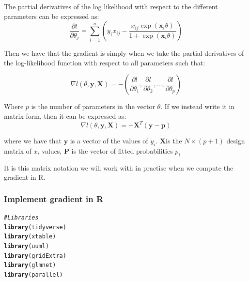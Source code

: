 \documentclass[11pt, a4paper, english]{article}\usepackage[]{graphicx}\usepackage[dvipsnames]{xcolor}
\makeatletter
\newcommand{\hlcom}[1]{\textcolor[rgb]{0.678,0.584,0.686}{\textit{#1}}}%
\newcommand{\hlstd}[1]{\textcolor[rgb]{0.345,0.345,0.345}{#1}}%
\newcommand{\hlkwd}[1]{\textcolor[rgb]{0.737,0.353,0.396}{\textbf{#1}}}%
\newenvironment{kframe}{%
 \def\at@end@of@kframe{}%
 \ifinner\ifhmode%
  \def\at@end@of@kframe{\end{minipage}}%
  \begin{minipage}{\columnwidth}%
 \fi\fi%
 \def\FrameCommand##1{\hskip\@totalleftmargin \hskip-\fboxsep
 \colorbox{shadecolor}{##1}\hskip-\fboxsep
     \hskip-\linewidth \hskip-\@totalleftmargin \hskip\columnwidth}%
 \MakeFramed {\advance\hsize-\width
   \@totalleftmargin\z@ \linewidth\hsize
   \@setminipage}}%
 {\par\unskip\endMakeFramed%
 \at@end@of@kframe}
\newenvironment{knitrout}{}{} %
\makeatother
\begin{document}

The partial derivatives of the log likelihood with respect to the different parameters can be expressed as:
\[
\frac{\partial l}{\partial \theta_j} = \sum_{i=1}^n \left(y_i x_{ij} - \frac{x_{ij} \exp(\mathbf{x}_i \theta)}{1 + \exp(\mathbf{x}_i \theta)}\right)
\]

Then we have that the gradient is simply when we take the partial derivatives of the log-likelihood function with respect to all parameters such that:


\[
\nabla l(\theta, \mathbf{y}, \mathbf{X}) =-  \left(\frac{\partial l}{\partial \theta_1}, \frac{\partial l}{\partial \theta_2}, \ldots, \frac{\partial l}{\partial \theta_p}\right)
\]

Where \(p\) is the number of parameters in the vector \(\theta\).
If we instead write it in matrix form, then it can be expressed as:
\[\nabla l(\theta, \mathbf{y}, \mathbf{X}) = - \mathbf{X}^T (\mathbf{y} - \mathbf{p}) \]

where we have that
$\bm{y}$ is a vector of the values of $y_i$.
$\bm{X}$is the $ N \times (p+1) $ design matrix of $x_i$ values, $\bm{P}$  is the vector of fitted probabilities $p_i$

It is this matrix notation we will work with in practise when we compute the gradient in R.
\subsubsection{Implement gradient in R}


\begin{knitrout}
\color{fgcolor}\begin{kframe}
\begin{alltt}
\hlcom{#Libraries}
 \hlkwd{library}\hlstd{(tidyverse)}
 \hlkwd{library}\hlstd{(xtable)}
 \hlkwd{library}\hlstd{(uuml)}
 \hlkwd{library}\hlstd{(gridExtra)}
 \hlkwd{library}\hlstd{(glmnet)}
 \hlkwd{library}\hlstd{(parallel)}
\end{alltt}
\end{kframe}
\end{knitrout}
\end{document}
